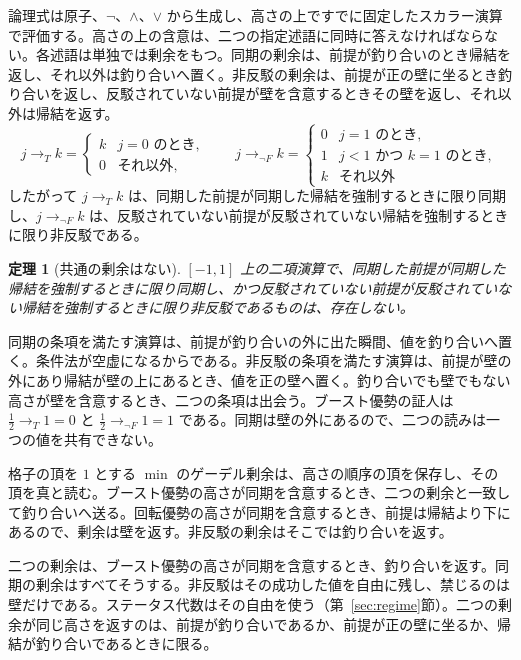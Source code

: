 \documentclass[a4paper]{article}
\newtheorem{theorem}{定理}[section]
\theoremstyle{definition}
\begin{document}
論理式は原子、\(\neg\)、\(\wedge\)、\(\vee\) から生成し、高さの上ですでに固定したスカラー演算で評価する。高さの上の含意は、二つの指定述語に同時に答えなければならない。各述語は単独では剰余をもつ。同期の剰余は、前提が釣り合いのとき帰結を返し、それ以外は釣り合いへ置く。非反駁の剰余は、前提が正の壁に坐るとき釣り合いを返し、反駁されていない前提が壁を含意するときその壁を返し、それ以外は帰結を返す。
\begin{equation}
\label{eq:residuals}
j\to_T k=
\begin{cases}
k & j=0\text{ のとき},\\
0 & \text{それ以外},
\end{cases}
\qquad
j\to_{\lnot F} k=
\begin{cases}
0 & j=1\text{ のとき},\\
1 & j<1\text{ かつ }k=1\text{ のとき},\\
k & \text{それ以外}
\end{cases}
\end{equation}
したがって \(j\to_T k\) は、同期した前提が同期した帰結を強制するときに限り同期し、\(j\to_{\lnot F} k\) は、反駁されていない前提が反駁されていない帰結を強制するときに限り非反駁である。

\begin{theorem}[共通の剰余はない]
\label{thm:no-common-imp}
\([-1,1]\) 上の二項演算で、同期した前提が同期した帰結を強制するときに限り同期し、かつ反駁されていない前提が反駁されていない帰結を強制するときに限り非反駁であるものは、存在しない。
\end{theorem}

同期の条項を満たす演算は、前提が釣り合いの外に出た瞬間、値を釣り合いへ置く。条件法が空虚になるからである。非反駁の条項を満たす演算は、前提が壁の外にあり帰結が壁の上にあるとき、値を正の壁へ置く。釣り合いでも壁でもない高さが壁を含意するとき、二つの条項は出会う。ブースト優勢の証人は \(\tfrac12\to_T 1=0\) と \(\tfrac12\to_{\lnot F} 1=1\) である。同期は壁の外にあるので、二つの読みは一つの値を共有できない。

格子の頂を \(1\) とする \(\min\) のゲーデル剰余は、高さの順序の頂を保存し、その頂を真と読む。ブースト優勢の高さが同期を含意するとき、二つの剰余と一致して釣り合いへ送る。回転優勢の高さが同期を含意するとき、前提は帰結より下にあるので、剰余は壁を返す。非反駁の剰余はそこでは釣り合いを返す。

二つの剰余は、ブースト優勢の高さが同期を含意するとき、釣り合いを返す。同期の剰余はすべてそうする。非反駁はその成功した値を自由に残し、禁じるのは壁だけである。ステータス代数はその自由を使う（第~\ref{sec:regime}節）。二つの剰余が同じ高さを返すのは、前提が釣り合いであるか、前提が正の壁に坐るか、帰結が釣り合いであるときに限る。
\end{document}
